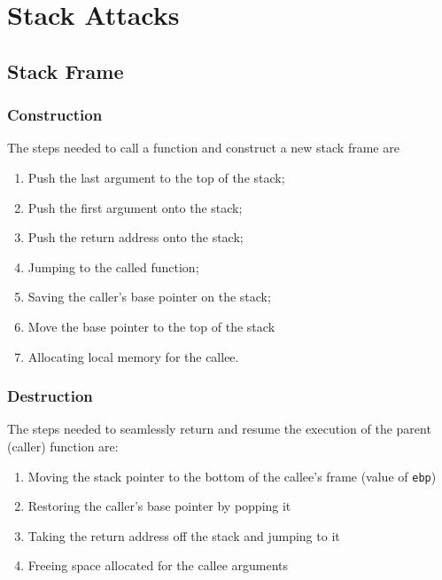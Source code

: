 \section{Stack Attacks}
\subsection{Stack Frame}
\subsubsection{Construction}
The steps needed to call a function and construct a new stack frame are
\begin{enumerate}
  \item Push the last argument to the top of the stack;
  \item Push the first argument onto the stack;
  \item Push the return address onto the stack;
  \item Jumping to the called function;
  \item Saving the caller's base pointer on the stack;
  \item Move the base pointer to the top of the stack
  \item Allocating local memory for the callee.
\end{enumerate}

\subsubsection{Destruction}
The steps needed to seamlessly return and resume the execution of the parent
(caller) function are:
\begin{enumerate}
  \item Moving the stack pointer to the bottom of the callee's frame (value of
  \texttt{ebp})
  \item Restoring the caller's base pointer by popping it
  \item Taking the return address off the stack and jumping to it
  \item Freeing space allocated for the callee arguments
\end{enumerate}
